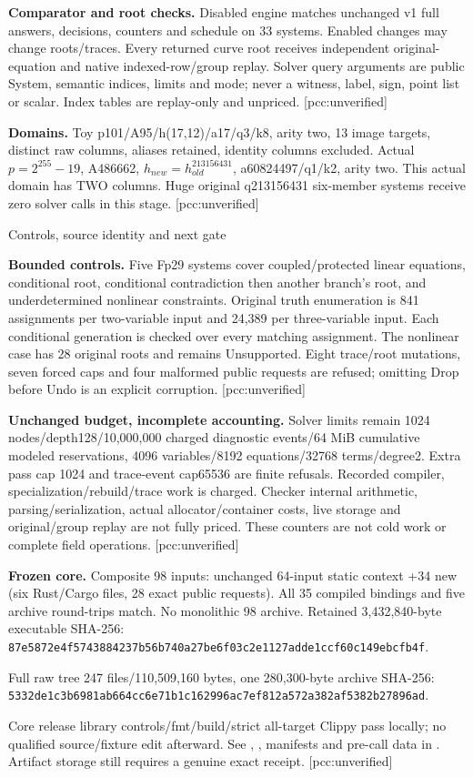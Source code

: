 \documentclass[10pt]{article}
\begin{document}
\textbf{Comparator and root checks.} Disabled engine matches unchanged v1
full answers, decisions, counters and schedule on 33 systems. Enabled changes
may change roots/traces. Every returned curve root receives independent
original-equation and native indexed-row/group replay. Solver query arguments
are public System, semantic indices, limits and mode; never a witness, label,
sign, point list or scalar. Index tables are replay-only and unpriced.
[pcc:unverified]

\textbf{Domains.} Toy p101/A95/h(17,12)/a17/q3/k8, arity two, 13 image targets,
distinct raw columns, aliases retained, identity columns excluded. Actual
$p=2^{255}-19$, A486662, $h_{new}=h_{old}^{213156431}$, a60824497/q1/k2, arity two.
This actual domain has TWO columns. Huge original q213156431 six-member
systems receive zero solver calls in this stage. [pcc:unverified]

\newpage
\begin{center}\Large Controls, source identity and next gate\end{center}
\textbf{Bounded controls.} Five Fp29 systems cover coupled/protected linear
equations, conditional root, conditional contradiction then another branch's
root, and underdetermined nonlinear constraints. Original truth enumeration
is 841 assignments per two-variable input and 24,389 per three-variable input.
Each conditional generation is checked over every matching assignment. The
nonlinear case has 28 original roots and remains Unsupported. Eight trace/root
mutations, seven forced caps and four malformed public requests are refused;
omitting Drop before Undo is an explicit corruption. [pcc:unverified]

\textbf{Unchanged budget, incomplete accounting.} Solver limits remain 1024
nodes/depth128/10,000,000 charged diagnostic events/64 MiB cumulative modeled
reservations, 4096 variables/8192 equations/32768 terms/degree2. Extra pass cap
1024 and trace-event cap65536 are finite refusals. Recorded compiler,
specialization/rebuild/trace work is charged. Checker internal arithmetic,
parsing/serialization, actual allocator/container costs, live storage and
original/group replay are not fully priced. These counters are not cold work
or complete field operations. [pcc:unverified]

\textbf{Frozen core.} Composite 98 inputs: unchanged 64-input static context
+34 new (six Rust/Cargo files, 28 exact public requests). All 35 compiled
bindings and five archive round-trips match. No monolithic 98 archive.
Retained 3,432,840-byte executable SHA-256:\\
\texttt{87e5872e4f5743884237b56b740a27be6f03c2e1127adde1ccf60c149ebcfb4f}.\par
Full raw tree 247 files/110,509,160 bytes, one 280,300-byte archive SHA-256:\\
\texttt{5332de1c3b6981ab664cc6e71b1c162996ac7ef812a572a382af5382b27896ad}.\par
Core release library controls/fmt/build/strict all-target Clippy pass locally;
no qualified source/fixture edit afterward. See ,
, manifests and pre-call data in .
Artifact storage still requires a genuine exact receipt. [pcc:unverified]
\end{document}
